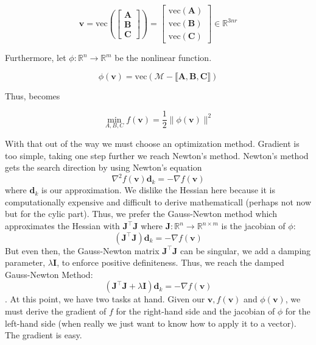     \begin{equation*}
        \mathbf{v} = \text{vec}
        \left(
        \left[
            \begin{array}{c}
                \mathbf{A} \\
                \mathbf{B} \\
                \mathbf{C}
            \end{array}
        \right]
        \right) = 
        \left[
            \begin{array}{c}
                \text{vec}(\mathbf{A}) \\
                \text{vec}(\mathbf{B}) \\
                \text{vec}(\mathbf{C})
            \end{array}
        \right]
        \in \mathbb{R}^{3nr}
    \end{equation*}

    Furthermore, let $\phi: \mathbb{R}^n \to \mathbb{R}^m$ be the nonlinear
    function. 

    \begin{equation}
        \phi (\mathbf{v}) = \text{vec}(\mathcal{M} - \llbracket \mathbf{A, B, C} \rrbracket)
    \end{equation}

    Thus,  becomes 

    \begin{equation}
        \min_{A, B, C} f(\mathbf{v}) = \frac{1}{2} \|\phi (\mathbf{v})\|^2
    \end{equation}

    With that out of the way we must choose an optimization method. Gradient is
    too simple, taking one step further we reach Newton's method. Newton's
    method gets the search direction by using Newton's equation
    \[\nabla^2 f(\mathbf{v})\mathbf{d}_k = -\nabla f(\mathbf{v})\] where
    $\mathbf{d}_k$ is our approximation. We dislike the Hessian here because it
    is computationally expensive and difficult to derive mathematicall (perhaps
    not now but for the cylic part). Thus, we prefer the Gauss-Newton method
    which approximates the Hessian with $\mathbf{J^\intercal J}$ where
    $\mathbf{J}: \mathbb{R}^n\to \mathbb{R}^{n\times m}$ is the jacobian of
    $\phi$: \[(\mathbf{J^\intercal J})\mathbf{d}_k = -\nabla f(\mathbf{v})\] But
    even then, the Gauss-Newton matrix $\mathbf{J^\intercal J}$ can be singular,
    we add a damping parameter, $\lambda \mathbf{I}$, to enforce positive
    definiteness. Thus, we reach the damped Gauss-Newton Method:
    \[(\mathbf{J^\intercal J} + \lambda\mathbf{I})\mathbf{d}_k = -\nabla
    f(\mathbf{v})\]. At this point, we have two tasks at hand. Given our
    $\mathbf{v}, f(\mathbf{v})$ and $\phi(\mathbf{v})$, we must derive the
    gradient of $f$ for the right-hand side and the jacobian of $\phi$ for the
    left-hand side (when really we just want to know how to apply it to a
    vector). The gradient is easy. 


